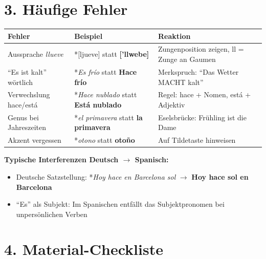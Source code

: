 \documentclass[11pt, a4paper]{article}
\newcommand{\fachfarbe}{spanisch}
\newcommand{\es}[1]{\textcolor{\fachfarbe}{\textbf{#1}}}
\begin{document}

\section*{3. Häufige Fehler}

\begin{fehlerbox}
\begin{tabularx}{\textwidth}{|l|X|X|}
\hline
\textbf{Fehler} & \textbf{Beispiel} & \textbf{Reaktion} \\
\hline
Aussprache \textit{llueve} & *[ljueve] statt \es{['llwebe]} & Zungenposition zeigen, ll = Zunge an Gaumen \\
\hline
``Es ist kalt'' wörtlich & *\textit{Es frío} statt \es{Hace frío} & Merkspruch: ``Das Wetter MACHT kalt'' \\
\hline
Verwechslung hace/está & *\textit{Hace nublado} statt \es{Está nublado} & Regel: hace + Nomen, está + Adjektiv \\
\hline
Genus bei Jahreszeiten & *\textit{el primavera} statt \es{la primavera} & Eselsbrücke: Frühling ist die Dame \\
\hline
Akzent vergessen & *\textit{otono} statt \es{otoño} & Auf Tildetaste hinweisen \\
\hline
\end{tabularx}
\end{fehlerbox}

\vspace{1em}

\textbf{Typische Interferenzen Deutsch $\rightarrow$ Spanisch:}
\begin{itemize}
    \item Deutsche Satzstellung: *\textit{Hoy hace en Barcelona sol} $\rightarrow$ \es{Hoy hace sol en Barcelona}
    \item ``Es'' als Subjekt: Im Spanischen entfällt das Subjektpronomen bei unpersönlichen Verben
\end{itemize}


\section*{4. Material-Checkliste}
\end{document}
